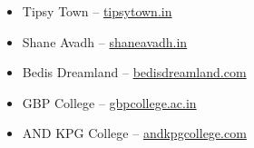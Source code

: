 \documentclass[a4paper,10.9pt]{article}
\begin{document}
\begin{itemize}
\item Tipsy Town – \href{https://tipsytown.in/}{tipsytown.in}
\item Shane Avadh – \href{https://shaneavadh.in/}{shaneavadh.in}
\item Bedis Dreamland – \href{https://www.bedisdreamland.com/}{bedisdreamland.com}
\item GBP College – \href{https://gbpcollege.ac.in}{gbpcollege.ac.in}
\item AND KPG College – \href{https://andkpgcollege.com}{andkpgcollege.com}
\end{itemize}
\end{document}
